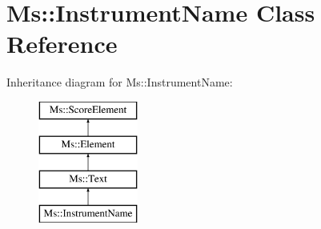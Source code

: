 \hypertarget{class_ms_1_1_instrument_name}{}\section{Ms\+:\+:Instrument\+Name Class Reference}
\label{class_ms_1_1_instrument_name}
Inheritance diagram for Ms\+:\+:Instrument\+Name\+:\begin{figure}[H]
\begin{center}
\leavevmode
\includegraphics[height=4.000000cm]{class_ms_1_1_instrument_name}
\end{center}
\end{figure}
